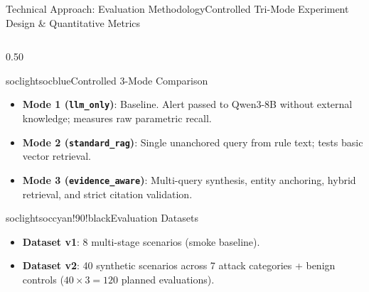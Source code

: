\documentclass[aspectratio=169, 10pt]{beamer}
\begin{document}
\begin{frame}{Technical Approach: Evaluation Methodology}{Controlled Tri-Mode Experiment Design \& Quantitative Metrics}
  \begin{columns}[T]
    \begin{column}{0.50\textwidth}
      \begin{cardbox}{soclight}{socblue}{Controlled 3-Mode Comparison}
        \begin{itemize}\setlength{\itemsep}{2pt}
          \item \textbf{Mode 1 (\texttt{llm\_only})}: Baseline. Alert passed to Qwen3-8B without external knowledge; measures raw parametric recall.
          \item \textbf{Mode 2 (\texttt{standard\_rag})}: Single unanchored query from rule text; tests basic vector retrieval.
          \item \textbf{Mode 3 (\texttt{evidence\_aware})}: Multi-query synthesis, entity anchoring, hybrid retrieval, and strict citation validation.
        \end{itemize}
      \end{cardbox}

      \begin{cardbox}{soclight}{soccyan!90!black}{Evaluation Datasets}
        \begin{itemize}\setlength{\itemsep}{1.5pt}
          \item \textbf{Dataset v1}: 8 multi-stage scenarios (smoke baseline).
          \item \textbf{Dataset v2}: 40 synthetic scenarios across 7 attack categories + benign controls ($40 \times 3 = 120$ planned evaluations).
        \end{itemize}
      \end{cardbox}
    \end{column}


\end{columns}
\end{frame}
\end{document}
